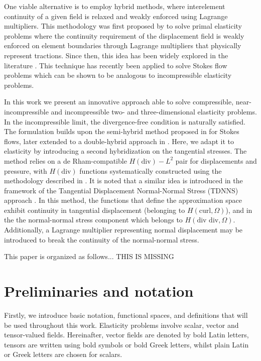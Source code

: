 \documentclass[english,11pt,3p,number,sort&compress]{elsarticle}
\newcommand{\phil}{\color{yellow}{\bf\Large PD} \color{cyan} }
\begin{document}
One viable alternative is to employ hybrid methods, where interelement continuity of a given field is relaxed and weakly enforced using Lagrange multipliers. This methodology was first proposed by \cite{raviart1977primal} to solve primal elasticity problems where the continuity requirement of the displacement field is weakly enforced on element boundaries through Lagrange multipliers that physically represent tractions. Since then, this idea has been widely explored in the literature \cite{brezzi2012mixed, harder2016hybrid, farhloul1997dual}. This technique has recently been applied to solve Stokes flow problems \cite{carvalho2024semi,puga2025stable} which can be shown to be analogous to incompressible elasticity problems. 

In this work we present an innovative approach able to solve compressible, near-incompressible and incompressible two- and three-dimensional elasticity problems. In the incompressible limit, the divergence-free condition is naturally satisfied. The formulation builds upon the semi-hybrid method proposed in \cite{carvalho2024semi} for Stokes flows, later extended to a double-hybrid approach in \cite{puga2025stable}. Here, we adapt it to elasticity by introducing a second hybridization on the tangential stresses. The method relies on a de Rham-compatible  $H(\text{div})-L^2$  pair for displacements and pressure, with $H(\text{div})$ functions systematically constructed using the methodology described in \cite{devloo2022efficient, de2013new}. It is noted that a similar idea is introduced in the framework of the Tangential Displacement Normal-Normal Stress (TDNNS) approach \cite{Joaquim2011}. In this method, the functions that define the approximation space exhibit continuity in tangential displacement (belonging to $H(\text{curl}, \Omega)$), and in the the normal-normal stress component which belongs to $H(\text{div div}, \Omega)$. Additionally, a Lagrange multiplier representing normal displacement may be introduced to break the continuity of the normal-normal stress.

{\phil This paper is organized as follows... THIS IS MISSING}

\section{Preliminaries and notation}

Firstly, we introduce basic notation, functional spaces, and definitions that will be used throughout this work. Elasticity problems involve scalar, vector and tensor-valued fields. Hereinafter, vector fields are denoted by bold Latin letters, tensors are written using bold symbols or bold Greek letters, whilst plain Latin or Greek letters are chosen for scalars.
\end{document}

